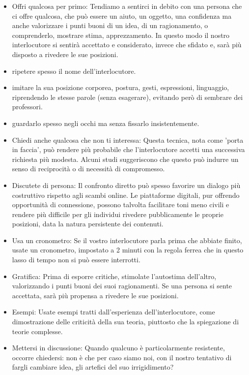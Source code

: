 \documentclass[12pt]{book} %
\begin{document}
\begin{itemize}
\item Offri qualcosa per primo: Tendiamo a sentirci in debito con una persona che ci offre qualcosa, che può essere un
aiuto, un oggetto, una confidenza ma anche valorizzare i punti buoni di un idea, di un ragionamento, o comprenderlo,
mostrare stima, apprezzamento. In questo modo il nostro interlocutore si sentirà accettato e considerato, invece che
sfidato e, sarà più disposto a rivedere le sue posizioni.
\item ripetere spesso il nome dell'interlocutore.
\item imitare la sua posizione corporea, postura, gesti, espressioni, linguaggio, riprendendo le stesse parole (senza
esagerare), evitando però di sembrare dei professori.
\item guardarlo spesso negli occhi ma senza fissarlo insistentemente.
\item Chiedi anche qualcosa che non ti interessa: Questa tecnica, nota come 'porta in faccia', può rendere più probabile che l'interlocutore accetti una successiva richiesta più modesta. Alcuni studi suggeriscono che questo può indurre un senso di reciprocità o di necessità di compromesso.
\item Discutete di persona: Il confronto diretto può spesso favorire un dialogo più costruttivo rispetto agli scambi online. Le piattaforme digitali, pur offrendo opportunità di connessione, possono talvolta facilitare toni meno civili e rendere più difficile per gli individui rivedere pubblicamente le proprie posizioni, data la natura persistente dei contenuti.
\item Usa un cronometro: Se il vostro interlocutore parla prima che abbiate finito, usate un cronometro, impostato a 2
minuti con la regola ferrea che in questo lasso di tempo non si può essere interrotti.
\item Gratifica: Prima di esporre critiche, stimolate l'autostima dell'altro, valorizzando i punti buoni dei suoi
ragionamenti. Se una persona si sente accettata, sarà più propensa a rivedere le sue posizioni.
\item Esempi: Usate esempi tratti dall'esperienza dell'interlocutore, come dimostrazione delle criticità della sua
teoria, piuttosto che la spiegazione di teorie complesse.
\item Mettersi in discussione: Quando qualcuno è particolarmente resistente, occorre chiedersi: non è che per caso siamo
noi, con il nostro tentativo di fargli cambiare idea, gli artefici del suo irrigidimento?
\end{itemize}
\end{document}
